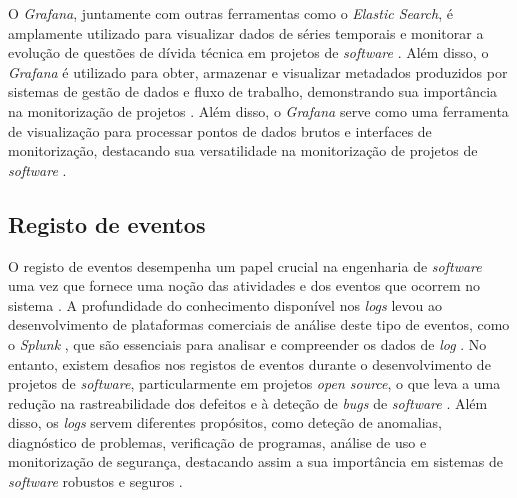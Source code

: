 O \textit{Grafana}, juntamente com outras ferramentas como o \textit{Elastic Search}, é amplamente 
utilizado para visualizar dados de séries temporais e monitorar a evolução de questões de dívida 
técnica em projetos de \textit{software} \cite{metrics2019b}. Além disso, o \textit{Grafana} é 
utilizado para obter, armazenar e visualizar metadados produzidos por sistemas de gestão de dados e
fluxo de trabalho, demonstrando sua importância na monitorização de projetos \cite{metrics2021}.
Além disso, o \textit{Grafana} serve como uma ferramenta de visualização para processar pontos de 
dados brutos e interfaces de monitorização, destacando sua versatilidade na monitorização de projetos 
de \textit{software} \cite{metrics2022}.

\subsection{Registo de eventos}

O registo de eventos desempenha um papel crucial na engenharia de \textit{software} uma vez que 
fornece uma noção das atividades e dos eventos que ocorrem no sistema \cite{logs2022}. A profundidade 
do conhecimento disponível nos \textit{logs} levou ao desenvolvimento de plataformas comerciais de 
análise deste tipo de eventos, como o \textit{Splunk} \cite{splunk}, que são essenciais para 
analisar e compreender os dados de \textit{log} \cite{logs2021}. No entanto, existem desafios nos 
registos de eventos durante o desenvolvimento de projetos de \textit{software}, particularmente em 
projetos \textit{open source}, o que leva a uma redução na rastreabilidade dos defeitos e à
deteção de \textit{bugs} de \textit{software} \cite{logs2018}. Além disso, os \textit{logs} servem 
diferentes propósitos, como deteção de anomalias, diagnóstico de problemas, verificação de programas, 
análise de uso e monitorização  de segurança, destacando assim a sua importância em sistemas de 
\textit{software} robustos e seguros \cite{logs2019}.

